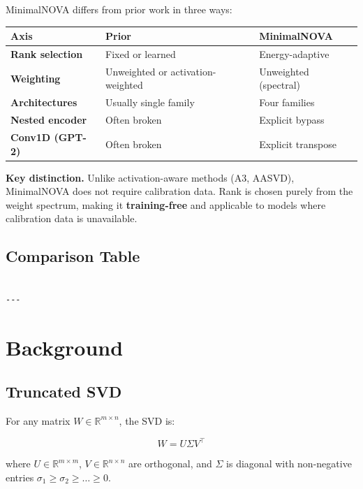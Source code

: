 MinimalNOVA differs from prior work in three ways:

\begin{table}[H]
\centering
\small
\begin{tabular}{lll}
\toprule
\textbf{Axis} & \textbf{Prior} & \textbf{MinimalNOVA} \\
\midrule
\textbf{Rank selection} & Fixed or learned & Energy-adaptive \\
\textbf{Weighting} & Unweighted or activation-weighted & Unweighted (spectral) \\
\textbf{Architectures} & Usually single family & Four families \\
\textbf{Nested encoder} & Often broken & Explicit bypass \\
\textbf{Conv1D (GPT-2)} & Often broken & Explicit transpose \\
\bottomrule
\end{tabular}
\end{table}

\textbf{Key distinction.} Unlike activation-aware methods (A3, AASVD), MinimalNOVA 
does not require calibration data. Rank is chosen purely from the weight 
spectrum, making it \textbf{training-free} and applicable to models where 
calibration data is unavailable.



\subsection{Comparison Table}

\begin{lstlisting}

---
\end{lstlisting}


\section{Background}

\subsection{Truncated SVD}

For any matrix $W \in \mathbb{R}^{m \times n}$, the SVD is:

\[
W = U \Sigma V^\top
\tag{3.1}
\]

where $U \in \mathbb{R}^{m \times m}$, $V \in \mathbb{R}^{n \times n}$ are 
orthogonal, and $\Sigma$ is diagonal with non-negative entries 
$\sigma_1 \geq \sigma_2 \geq \dots \geq 0$.

